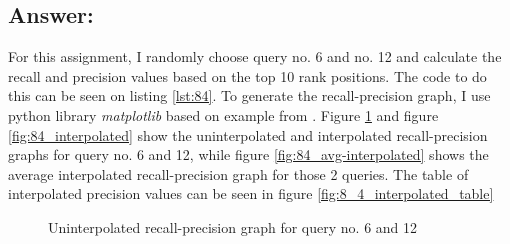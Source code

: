 \documentclass[letterpaper,11pt]{article}
\begin{document}
\subsection*{Answer:}
For this assignment, I randomly choose query no. 6 and no. 12 and calculate the recall and precision values based on the top 10 rank positions. The code to do this can be seen on listing \ref{lst:84}. To generate the recall-precision graph, I use python library \textit{matplotlib} \cite{matplotlib} based on example from \cite{matplotlib-example}. 
\newline
Figure \ref{fig:84_uninterpolated} and figure \ref{fig:84_interpolated} show the uninterpolated and interpolated recall-precision graphs for query no. 6 and 12, while figure \ref{fig:84_avg-interpolated} shows the average interpolated recall-precision graph for those 2 queries. The table of interpolated precision values can be seen in figure \ref{fig:8_4_interpolated_table}

\begin{figure}[H]
	\centering
	\caption{Uninterpolated recall-precision graph for query no. 6 and 12}
	\label{fig:84_uninterpolated}
\end{figure}
\end{document}
